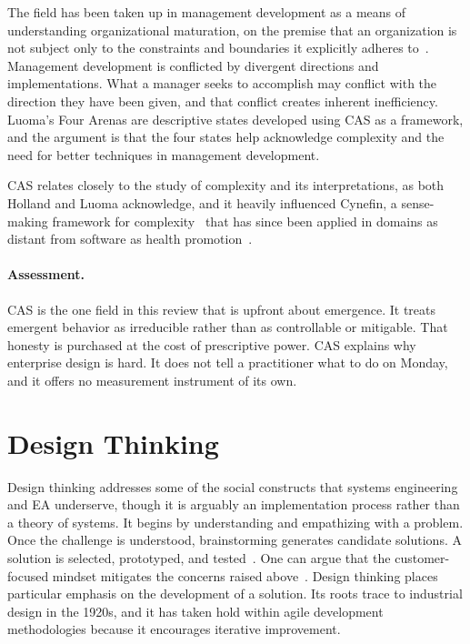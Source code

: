 \documentclass{csimq}
\begin{document}
The field has been taken up in management development as a means of
understanding organizational maturation, on the premise that an organization is
not subject only to the constraints and boundaries it explicitly
adheres to~\cite{luoma2006}. Management development is conflicted by divergent
directions and implementations. What a manager seeks to accomplish may conflict
with the direction they have been given, and that conflict creates inherent
inefficiency. Luoma's Four Arenas are descriptive states developed using CAS as
a framework, and the argument is that the four states help acknowledge
complexity and the need for better techniques in management development.

CAS relates closely to the study of complexity and its interpretations, as both
Holland and Luoma acknowledge, and it heavily influenced Cynefin, a
sense-making framework for complexity~\cite{kurtz2003} that has since been
applied in domains as distant from software as health
promotion~\cite{vanbeurden2011}.

\paragraph{Assessment.} CAS is the one field in this review that is
upfront about emergence. It treats emergent behavior as
irreducible rather than as controllable or mitigable. That honesty is purchased
at the cost of prescriptive power. CAS explains why enterprise design is hard.
It does not tell a practitioner what to do on Monday, and it offers no
measurement instrument of its own.

\section{Design Thinking}
\label{sec:dt}

Design thinking addresses some of the social constructs that systems engineering
and EA underserve, though it is arguably an implementation process rather than a
theory of systems. It begins by understanding and empathizing with a problem.
Once the challenge is understood, brainstorming generates candidate solutions. A
solution is selected, prototyped, and tested~\cite{dam2024}. One can argue that
the customer-focused mindset mitigates the concerns raised
above~\cite{dunne2018}. Design thinking places particular emphasis on the
development of a solution. Its roots trace to industrial design in the 1920s,
and it has taken hold within agile development methodologies because it
encourages iterative improvement.
\end{document}
